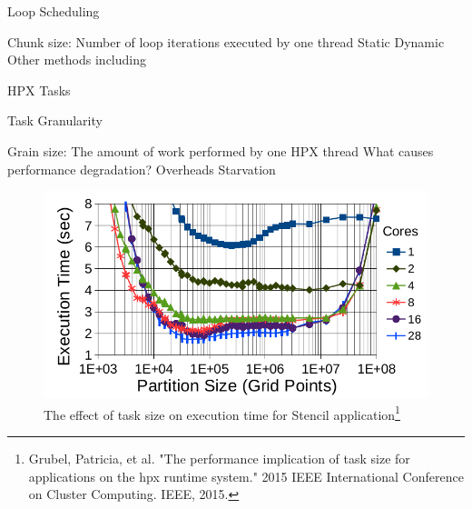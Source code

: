 \documentclass[10pt]{beamer}
\begin{document}
\begin{frame}{Loop Scheduling}
	\begin{outline}
		Chunk size: Number of loop iterations executed by one thread 
		\1Static
		\1Dynamic
		\1Other methods including
	\end{outline}
\end{frame}

\begin{frame}{HPX Tasks}
	\begin{outline}
		
	\end{outline}
\end{frame}

\begin{frame}{Task Granularity}
	\begin{outline}
		Grain size: The amount of work performed by one HPX thread
		\1What causes performance degradation?
		\2Overheads
		\2Starvation
		\begin{figure}
			\centering
			\includegraphics[width=0.72\linewidth]{images/task_granularity.png}
			\caption{The effect of task size on execution time for Stencil application\footnote{Grubel, Patricia, et al. "The performance implication of task size for applications on the hpx runtime system." 2015 IEEE International Conference on Cluster Computing. IEEE, 2015.}}	
	
		\end{figure}
		
	\end{outline}
\end{frame}
\end{document}
